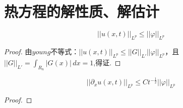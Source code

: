 \section{热方程的解性质、解估计}

\begin{theorem}
$$||u(x,t)||_{L^p}\leq ||\varphi||_{L^p}$$
\end{theorem}

\begin{proof}
    由$young$不等式：$||u(x,t)||_{L^p}\leq ||G||_{L'} ||\varphi||_{L^p}$，且$||G||_{L'} = \int_{R_n}|G(x)|\,dx=1$,得证.
\end{proof}

\begin{theorem}
    $$||\partial_x u(x,t)||_{L^p} \leq Ct^{-\frac{1}{2}}||\varphi||_{L^p}$$
\end{theorem}

\begin{proof}
    
\end{proof}